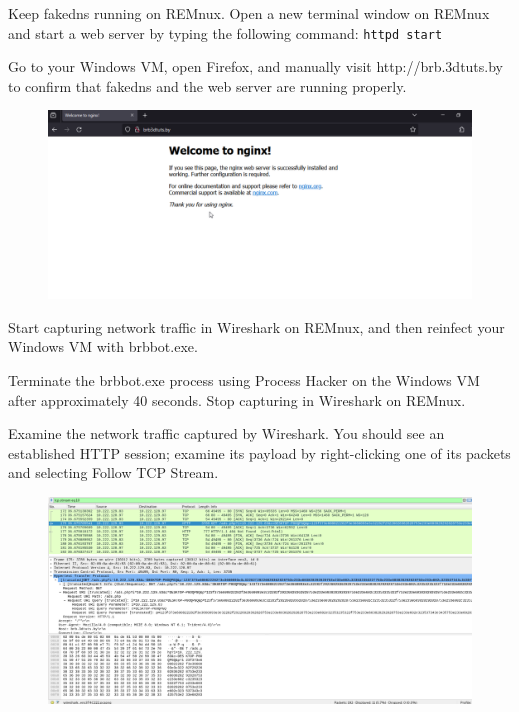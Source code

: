 \documentclass[]{project_plan}
\begin{document}
Keep fakedns running on REMnux. Open a new terminal window on REMnux
and start a web server by typing the following command:
\lstinline|httpd start|

Go to your Windows VM, open Firefox, and manually visit http://brb.3dtuts.by
to confirm that fakedns and the web server are running properly.

\begin{figure}[H]
  \centering
  \includegraphics[width=\linewidth]{fakedns page.png}
\end{figure}

Start capturing network traffic in Wireshark on REMnux, and then
reinfect your Windows VM with brbbot.exe.

Terminate the brbbot.exe process using Process Hacker on the Windows
VM after approximately 40 seconds. Stop capturing in Wireshark on REMnux.

Examine the network traffic captured by Wireshark. You should see an established
HTTP session; examine its payload by right-clicking one of its packets
and selecting Follow TCP Stream.

\begin{figure}[H]
  \centering
  \includegraphics[width=\linewidth]{lab3 brb wireshark.png}
\end{figure}
\end{document}
